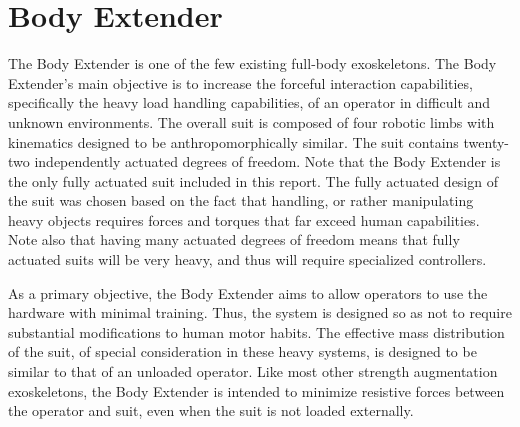 


%
\section{Body Extender}

The Body Extender is one of the few existing full-body exoskeletons.  The Body Extender's main objective is to increase the forceful interaction capabilities, specifically the heavy load handling capabilities, of an operator in difficult and unknown environments.  The overall suit is composed of four robotic limbs with kinematics designed to be anthropomorphically similar.  The suit contains twenty-two independently actuated degrees of freedom.  Note that the Body Extender is the only fully actuated suit included in this report.  The fully actuated design of the suit was chosen based on the fact that handling, or rather manipulating heavy objects requires forces and torques that far exceed human capabilities.  Note also that having many actuated degrees of freedom means that fully actuated suits will be very heavy, and thus will require specialized controllers.

As a primary objective, the Body Extender aims to allow operators to use the hardware with minimal training.  Thus, the system is designed so as not to require substantial modifications to human motor habits.  The effective mass distribution of the suit, of special consideration in these heavy systems, is designed to be similar to that of an unloaded operator.  Like most other strength augmentation exoskeletons, the Body Extender is intended to minimize resistive forces between the operator and suit, even when the suit is not loaded externally. 

